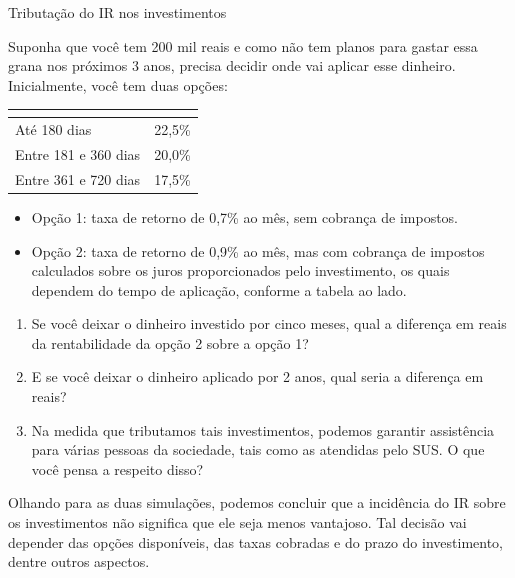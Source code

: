 \begin{task}{Tributação do IR nos investimentos}

Suponha que você tem 200 mil reais e como não tem planos para gastar essa grana nos próximos 3 anos, precisa decidir onde vai aplicar esse dinheiro. Inicialmente, você tem duas opções:

\begin{table}[H]
\centering
\begin{tabu} to \textwidth{|l|l|}
\hline
{} &  \\
\hline
Até 180 dias & 22,5\% \\
\hline
Entre 181 e 360 dias & 20,0\% \\
\hline
Entre 361 e 720 dias & 17,5\% \\
\hline
\end{tabu}
\end{table}

\begin{itemize}
\item Opção 1: taxa de retorno de 0,7\% ao mês, sem cobrança de impostos.
\item Opção 2: taxa de retorno de 0,9\% ao mês, mas com cobrança de impostos calculados sobre os juros proporcionados pelo investimento, os quais dependem do tempo de aplicação, conforme a tabela ao lado.
\end{itemize}

\begin{enumerate}
\item Se você deixar o dinheiro investido por cinco meses, qual a diferença em reais da rentabilidade da opção 2 sobre a opção 1?
\item E se você deixar o dinheiro aplicado por 2 anos, qual seria a diferença em reais?
\item Na medida que tributamos tais investimentos, podemos garantir assistência para várias pessoas da sociedade, tais como as atendidas pelo SUS. O que você pensa a respeito disso?
\end{enumerate}
\end{task}




Olhando para as duas simulações, podemos concluir que a incidência do IR sobre os investimentos não significa que ele seja menos vantajoso. Tal decisão vai depender das opções disponíveis, das taxas cobradas e do prazo do investimento, dentre outros aspectos.

